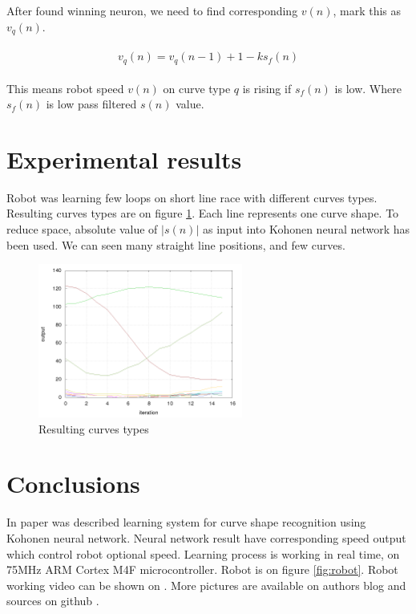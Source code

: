 \documentclass[twoside]{oss-conf-eng}
\begin{document}
After found winning neuron, we need to find corresponding $v(n)$, mark this as
$v_q(n)$.


\begin{eqnarray}
\begin{split}
\label{speed_estimating}
v_q(n) = v_q(n-1) + 1 - k s_f(n)
\end{split}
\end{eqnarray}

This means robot speed $v(n)$ on curve type $q$ is rising if $s_f(n)$ is low.
Where $s_f(n)$ is low pass filtered $s(n)$ value.

\section{Experimental results}

Robot was learning few loops on short line race with different curves types.
Resulting curves types are on figure \ref{fig:curves}. Each line represents
one curve shape. To reduce space, absolute value of $|s(n)|$ as input into
Kohonen neural network has been used. We can seen many straight line positions, and
few curves.

\begin{figure}[]
    \centering
    \includegraphics[width=0.6\textwidth]{prediction/predictor.png}
    \caption{Resulting curves types}
    \label{fig:curves}
\end{figure}

\section{Conclusions}

In paper was described learning system for curve shape recognition using Kohonen
neural network. Neural network result have corresponding speed output which control
robot optional speed. Learning process is working in real time,
on 75MHz ARM Cortex M4F microcontroller. Robot is on figure \ref{fig:robot}.
Robot working video can be shown on \cite{robot_video}. More pictures are
available on authors blog and sources on github \cite{blog_git}.
\end{document}
